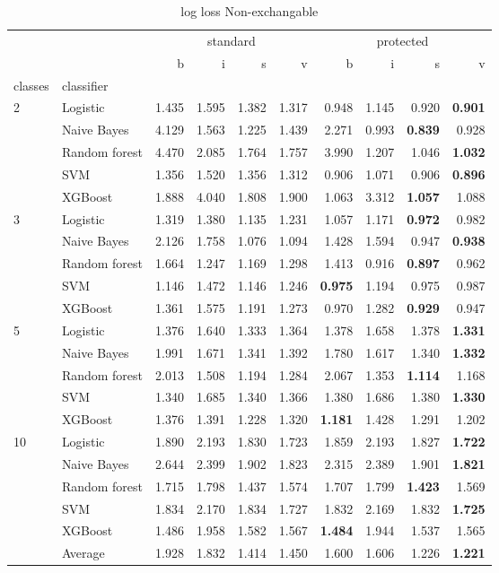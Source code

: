 \begin{table}
\caption{log loss Non-exchangable}
\begin{tabular}{l|l|rrrr|rrrr}
\toprule
 &  & \multicolumn{4}{c}{standard} & \multicolumn{4}{c}{protected} \\
 &  & b & i & s & v & b & i & s & v \\
classes & classifier &  &  &  &  &  &  &  &  \\
\midrule
\midrule
\multirow[c]{5}{*}{2} & Logistic & 1.435 & 1.595 & 1.382 & 1.317 & 0.948 & 1.145 & 0.920 & \textbf{0.901} \\
 & Naive Bayes & 4.129 & 1.563 & 1.225 & 1.439 & 2.271 & 0.993 & \textbf{0.839} & 0.928 \\
 & Random forest & 4.470 & 2.085 & 1.764 & 1.757 & 3.990 & 1.207 & 1.046 & \textbf{1.032} \\
 & SVM & 1.356 & 1.520 & 1.356 & 1.312 & 0.906 & 1.071 & 0.906 & \textbf{0.896} \\
 & XGBoost & 1.888 & 4.040 & 1.808 & 1.900 & 1.063 & 3.312 & \textbf{1.057} & 1.088 \\
\midrule
\multirow[c]{5}{*}{3} & Logistic & 1.319 & 1.380 & 1.135 & 1.231 & 1.057 & 1.171 & \textbf{0.972} & 0.982 \\
 & Naive Bayes & 2.126 & 1.758 & 1.076 & 1.094 & 1.428 & 1.594 & 0.947 & \textbf{0.938} \\
 & Random forest & 1.664 & 1.247 & 1.169 & 1.298 & 1.413 & 0.916 & \textbf{0.897} & 0.962 \\
 & SVM & 1.146 & 1.472 & 1.146 & 1.246 & \textbf{0.975} & 1.194 & 0.975 & 0.987 \\
 & XGBoost & 1.361 & 1.575 & 1.191 & 1.273 & 0.970 & 1.282 & \textbf{0.929} & 0.947 \\
\midrule
\multirow[c]{5}{*}{5} & Logistic & 1.376 & 1.640 & 1.333 & 1.364 & 1.378 & 1.658 & 1.378 & \textbf{1.331} \\
 & Naive Bayes & 1.991 & 1.671 & 1.341 & 1.392 & 1.780 & 1.617 & 1.340 & \textbf{1.332} \\
 & Random forest & 2.013 & 1.508 & 1.194 & 1.284 & 2.067 & 1.353 & \textbf{1.114} & 1.168 \\
 & SVM & 1.340 & 1.685 & 1.340 & 1.366 & 1.380 & 1.686 & 1.380 & \textbf{1.330} \\
 & XGBoost & 1.376 & 1.391 & 1.228 & 1.320 & \textbf{1.181} & 1.428 & 1.291 & 1.202 \\
\midrule
\multirow[c]{5}{*}{10} & Logistic & 1.890 & 2.193 & 1.830 & 1.723 & 1.859 & 2.193 & 1.827 & \textbf{1.722} \\
 & Naive Bayes & 2.644 & 2.399 & 1.902 & 1.823 & 2.315 & 2.389 & 1.901 & \textbf{1.821} \\
 & Random forest & 1.715 & 1.798 & 1.437 & 1.574 & 1.707 & 1.799 & \textbf{1.423} & 1.569 \\
 & SVM & 1.834 & 2.170 & 1.834 & 1.727 & 1.832 & 2.169 & 1.832 & \textbf{1.725} \\
 & XGBoost & 1.486 & 1.958 & 1.582 & 1.567 & \textbf{1.484} & 1.944 & 1.537 & 1.565 \\\midrule\ & Average & 1.928 & 1.832 & 1.414 & 1.450 & 1.600 & 1.606 & 1.226 & \textbf{1.221} \\
\bottomrule
\end{tabular}
\end{table}
